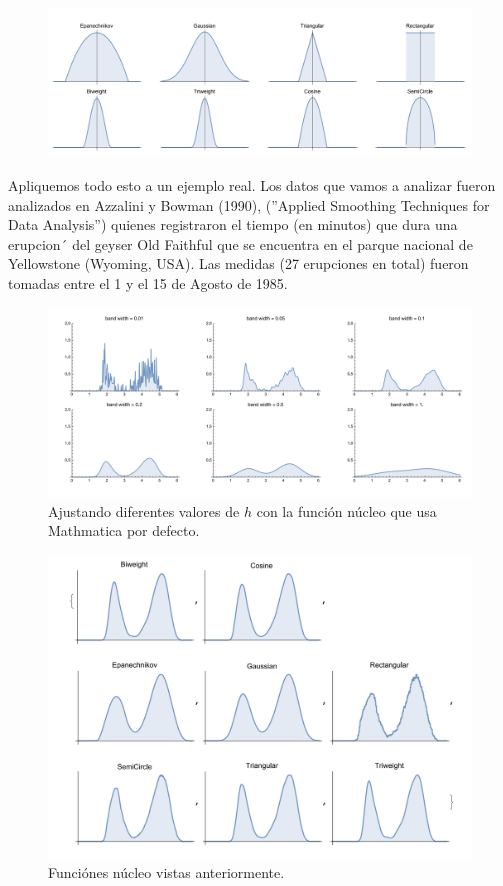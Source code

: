 \begin{figure}[H]
    \centering
    \includegraphics[width=\textwidth]{imagenes6/nucleos.png}
\end{figure}
Apliquemos todo esto a un ejemplo real. Los datos que vamos a analizar fueron analizados en Azzalini y Bowman (1990), (”Applied Smoothing Techniques for Data Analysis”) quienes registraron el tiempo (en minutos) que dura una erupcion´ del geyser Old Faithful que se encuentra en el parque nacional de Yellowstone (Wyoming, USA). Las medidas (27 erupciones en total) fueron tomadas entre el 1 y el 15 de Agosto de 1985.
\begin{figure}[H]
    \centering
    \includegraphics[width=1\textwidth]{imagenes6/nucleo1.png}
    \caption{Ajustando diferentes valores de $h$ con la función núcleo que usa Mathmatica por defecto.}
\end{figure}

\begin{figure}[H]
    \centering
    \includegraphics[width=1\textwidth]{imagenes6/nucleo3.png}
    \caption{Funciónes núcleo vistas anteriormente.}
\end{figure}